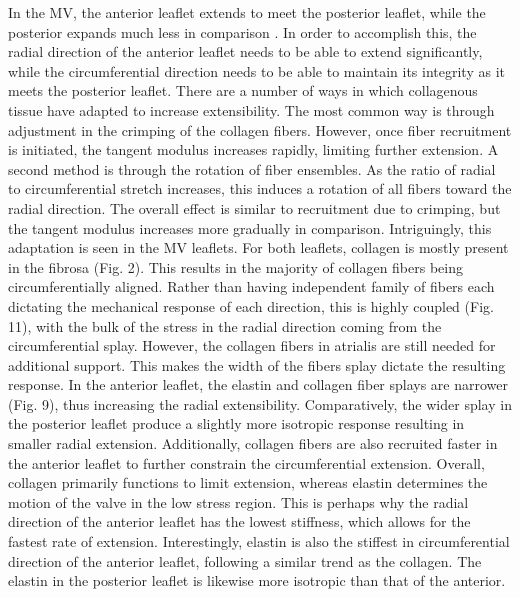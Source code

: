     In the MV, the anterior leaflet extends to meet the posterior leaflet, while the posterior expands much less in comparison \cite{amini_vivo_2012}\cite{rausch_vivo_2011}. In order to accomplish this, the radial direction of the anterior leaflet needs to be able to extend significantly, while the circumferential direction needs to be able to maintain its integrity as it meets the posterior leaflet. There are a number of ways in which collagenous tissue have adapted to increase extensibility. The most common way is through adjustment in the crimping of the collagen fibers. However, once fiber recruitment is initiated, the tangent modulus increases rapidly, limiting further extension. A second method is through the rotation of fiber ensembles. As the ratio of radial to circumferential stretch increases, this induces a rotation of all fibers toward the radial direction. The overall effect is similar to recruitment due to crimping, but the tangent modulus increases more gradually in comparison. Intriguingly, this adaptation is seen in the MV leaflets. For both leaflets, collagen is mostly present in the fibrosa (Fig. 2). This results in the majority of collagen fibers being circumferentially aligned. Rather than having independent family of fibers each dictating the mechanical response of each direction, this is highly coupled (Fig. 11), with the bulk of the stress in the radial direction coming from the circumferential splay. However, the collagen fibers in atrialis are still needed for additional support. This makes the width of the fibers splay dictate the resulting response. In the anterior leaflet, the elastin and collagen fiber splays are narrower (Fig. 9), thus increasing the radial extensibility. Comparatively, the wider splay in the posterior leaflet produce a slightly more isotropic response resulting in smaller radial extension. Additionally, collagen fibers are also recruited faster in the anterior leaflet to further constrain the circumferential extension. Overall, collagen primarily functions to limit extension, whereas elastin determines the motion of the valve in the low stress region. This is perhaps why the radial direction of the anterior leaflet has the lowest stiffness, which allows for the fastest rate of extension. Interestingly, elastin is also the stiffest in circumferential direction of the anterior leaflet, following a similar trend as the collagen. The elastin in the posterior leaflet is likewise more isotropic than that of the anterior.
    
    
    
